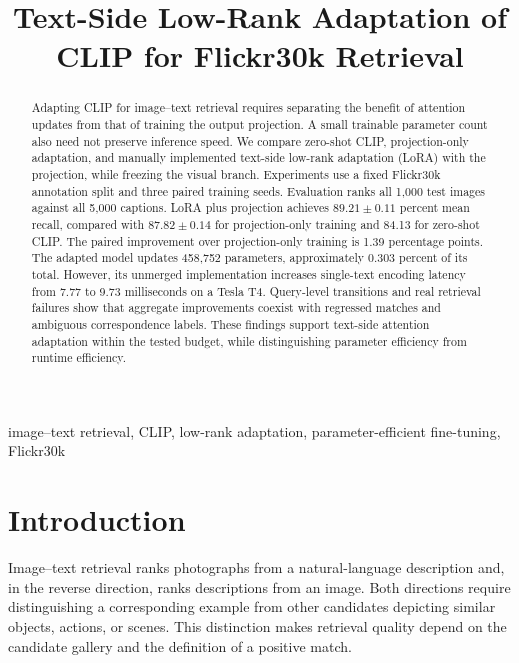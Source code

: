 \documentclass[conference]{IEEEtran}
\begin{document}
\title{Text-Side Low-Rank Adaptation of CLIP for Flickr30k Retrieval}
\author{\IEEEauthorblockN{\AuthorName}
\IEEEauthorblockA{\textit{\AuthorDepartment}\\
\textit{\AuthorInstitution}\\
\AuthorLocation\\
\AuthorEmail}}
\maketitle

\begin{abstract}
Adapting CLIP for image--text retrieval requires separating the benefit of attention updates from that of training the output projection. A small trainable parameter count also need not preserve inference speed. We compare zero-shot CLIP, projection-only adaptation, and manually implemented text-side low-rank adaptation (LoRA) with the projection, while freezing the visual branch. Experiments use a fixed Flickr30k annotation split and three paired training seeds. Evaluation ranks all 1,000 test images against all 5,000 captions. LoRA plus projection achieves $89.21\pm0.11$ percent mean recall, compared with $87.82\pm0.14$ for projection-only training and 84.13 for zero-shot CLIP. The paired improvement over projection-only training is 1.39 percentage points. The adapted model updates 458,752 parameters, approximately 0.303 percent of its total. However, its unmerged implementation increases single-text encoding latency from 7.77 to 9.73 milliseconds on a Tesla T4. Query-level transitions and real retrieval failures show that aggregate improvements coexist with regressed matches and ambiguous correspondence labels. These findings support text-side attention adaptation within the tested budget, while distinguishing parameter efficiency from runtime efficiency.
\end{abstract}

\begin{IEEEkeywords}
image--text retrieval, CLIP, low-rank adaptation, parameter-efficient fine-tuning, Flickr30k
\end{IEEEkeywords}

\section{Introduction}
Image--text retrieval ranks photographs from a natural-language description and, in the reverse direction, ranks descriptions from an image. Both directions require distinguishing a corresponding example from other candidates depicting similar objects, actions, or scenes. This distinction makes retrieval quality depend on the candidate gallery and the definition of a positive match.
\end{document}
